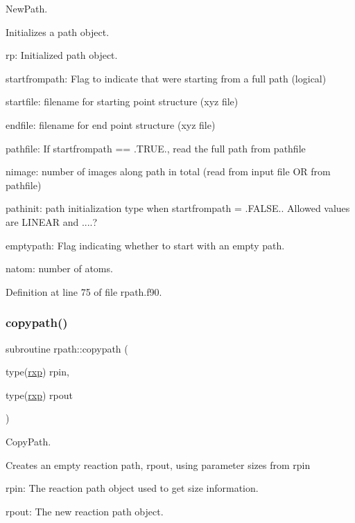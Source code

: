 New\+Path. 

Initializes a path object.


\begin{DoxyItemize}
\item rp\+: Initialized path object.
\item startfrompath\+: Flag to indicate that we\textquotesingle{}re starting from a full path (logical)
\item startfile\+: filename for starting point structure (xyz file)
\item endfile\+: filename for end point structure (xyz file)
\item pathfile\+: If startfrompath == .T\+R\+UE., read the full path from pathfile
\item nimage\+: number of images along path in total (read from input file OR from pathfile)
\item pathinit\+: path initialization type when startfrompath = .F\+A\+L\+SE.. Allowed values are \textquotesingle{}L\+I\+N\+E\+AR\textquotesingle{} and ....?
\item emptypath\+: Flag indicating whether to start with an empty path.
\item natom\+: number of atoms. 
\end{DoxyItemize}

Definition at line 75 of file rpath.\+f90.

\mbox{\label{namespacerpath_ad6c77a07ce6a59e54a4774305efe44d4}} 
\subsubsection{\texorpdfstring{copypath()}{copypath()}}
{\footnotesize\ttfamily subroutine rpath\+::copypath (\begin{DoxyParamCaption}\item[{type(\mbox{\hyperlink{structrpath_1_1rxp}{rxp}})}]{rpin,  }\item[{type(\mbox{\hyperlink{structrpath_1_1rxp}{rxp}})}]{rpout }\end{DoxyParamCaption})}



Copy\+Path. 

Creates an empty reaction path, rpout, using parameter sizes from rpin


\begin{DoxyItemize}
\item rpin\+: The reaction path object used to get size information.
\item rpout\+: The new reaction path object. 
\end{DoxyItemize}

